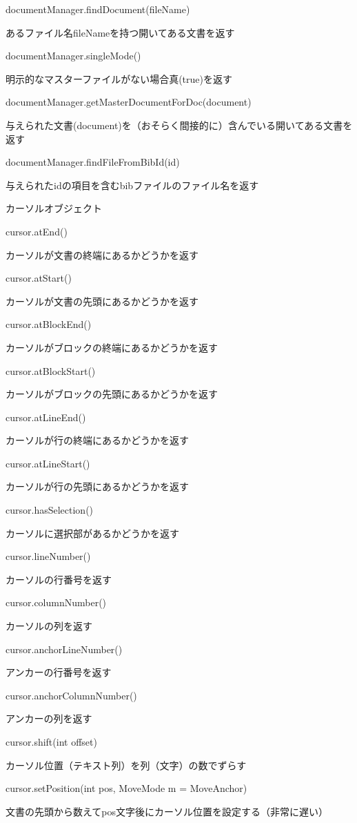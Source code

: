 \documentclass[]{book}
\begin{document}
documentManager.findDocument(fileName)

あるファイル名fileNameを持つ開いてある文書を返す

documentManager.singleMode()

明示的なマスターファイルがない場合真(true)を返す

documentManager.getMasterDocumentForDoc(document)

与えられた文書(document)を（おそらく間接的に）含んでいる開いてある文書を返す

documentManager.findFileFromBibId(id)

与えられたidの項目を含むbibファイルのファイル名を返す

カーソルオブジェクト

cursor.atEnd()

カーソルが文書の終端にあるかどうかを返す

cursor.atStart()

カーソルが文書の先頭にあるかどうかを返す

cursor.atBlockEnd()

カーソルがブロックの終端にあるかどうかを返す

cursor.atBlockStart()

カーソルがブロックの先頭にあるかどうかを返す

cursor.atLineEnd()

カーソルが行の終端にあるかどうかを返す

cursor.atLineStart()

カーソルが行の先頭にあるかどうかを返す

cursor.hasSelection()

カーソルに選択部があるかどうかを返す

cursor.lineNumber()

カーソルの行番号を返す

cursor.columnNumber()

カーソルの列を返す

cursor.anchorLineNumber()

アンカーの行番号を返す

cursor.anchorColumnNumber()

アンカーの列を返す

cursor.shift(int offset)

カーソル位置（テキスト列）を列（文字）の数でずらす

cursor.setPosition(int pos, MoveMode m = MoveAnchor)

文書の先頭から数えてpos文字後にカーソル位置を設定する（非常に遅い）
\end{document}
